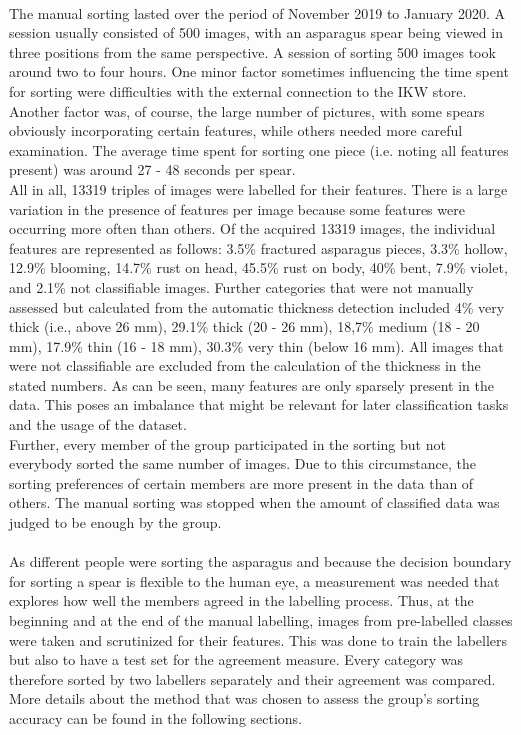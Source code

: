 \\
The manual sorting lasted over the period of November 2019 to January 2020.
A session usually consisted of 500 images, with an asparagus spear being viewed in three positions from the same perspective. A session of sorting 500 images took around two to four hours. One minor factor sometimes influencing the time spent for sorting were difficulties with the external connection to the IKW store. Another factor was, of course, the large number of pictures, with some spears obviously incorporating certain features, while others needed more careful examination. The average time spent for sorting one piece (i.e. noting all features present) was around 27 - 48 seconds per spear. \\
All in all, 13319 triples of images were labelled for their features.
There is a large variation in the presence of features per image because some features were occurring more often than others. Of the acquired 13319 images, the individual features are represented as follows: 3.5\% fractured asparagus pieces, 3.3\% hollow,  12.9\% blooming, 14.7\% rust on head, 45.5\% rust on body, 40\% bent, 7.9\% violet, and 2.1\% not classifiable images. Further categories that were not manually assessed but calculated from the automatic thickness detection included 4\% very thick (i.e., above 26 mm), 29.1\% thick (20 - 26 mm), 18,7\% medium (18 - 20 mm), 17.9\% thin (16 - 18 mm), 30.3\% very thin (below 16 mm). All images that were not classifiable are excluded from the calculation of the thickness in the stated numbers.
As can be seen, many features are only sparsely present in the data. This poses an imbalance that might be relevant for later classification tasks and the usage of the dataset. \\
Further, every member of the group participated in the sorting but not everybody sorted the same number of images. Due to this circumstance, the sorting preferences of certain members are more present in the data than of others.
The manual sorting was stopped when the amount of classified data was judged to be enough by the group. \\
\\
As different people were sorting the asparagus and because the decision boundary for sorting a spear is flexible to the human eye, a measurement was needed that explores how well the members agreed in the labelling process. Thus, at the beginning and at the end of the manual labelling, images from pre-labelled classes were taken and scrutinized for their features. This was done to train the labellers but also to have a test set for the agreement measure. Every category was therefore sorted by two labellers separately and their agreement was compared. More details about the method that was chosen to assess the group’s sorting accuracy can be found in the following sections.


